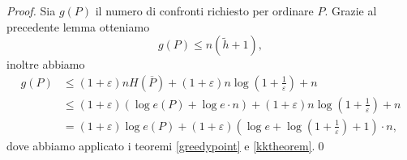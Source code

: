 \begin{proof}
	Sia \(g(P)\) il numero di confronti richiesto per ordinare \(P\). Grazie al precedente lemma otteniamo
	\[g(P)\le n(\tilde{h}+1),\]
	inoltre abbiamo 
	\begin{align}
		g(P)&\le (1+\varepsilon)nH(\overline{P})+(1+\varepsilon)n\log{\left(1+\frac{1}{\varepsilon}\right)}+n \nonumber \\
		&\le (1+\varepsilon)(\log{e(P)+\log{e\cdot n}})+(1+\varepsilon)n\log{\left(1+\frac{1}{\varepsilon}\right)}+n \nonumber \\
		&=(1+\varepsilon)\log{e(P)}+(1+\varepsilon)\left(\log{e}+\log{\left(1+\frac{1}{\varepsilon}\right)}+1\right)\cdot n, \nonumber 
	\end{align}
	dove abbiamo applicato i teoremi \ref{greedypoint} e \ref{kktheorem}.\qed 
\end{proof}

